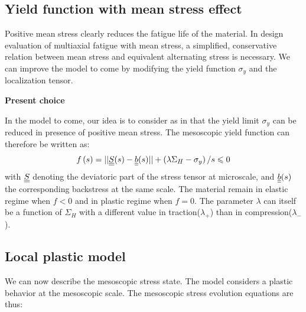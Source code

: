 \newpage
\subsection{Yield function with mean stress effect}
\label{sec:5.4.3}
Positive mean stress clearly reduces the fatigue life of the material. In design evaluation of multiaxial fatigue with mean stress, a simplified, conservative relation between mean stress and equivalent alternating stress is necessary. We can improve the model to come by modifying the yield function $\sigma_y$ and the localization tensor.

\vspace{6pt}
\textbf{Present choice}
\vspace{6pt}

In the model to come, our idea is to consider as in \cite{Maitournam2011232} that the yield limit $\sigma_y$ can be reduced in presence of positive mean stress. The mesoscopic yield function can therefore be written as:
\begin{equation}
f\left(s\right)=||\uline{\uline{S}}(s)-\uline{\uline{b}}(s)||+\left( \lambda \Sigma_H-\sigma_y\right) /s\leqslant 0
\label{eq.yieldfun}
\end{equation}
with $\uline{\uline{S}}$ denoting the deviatoric part of the stress tensor at microscale, and $\uline{\uline{b}}(s)$ the corresponding backstress at the same scale. The material remain in elastic regime when $f<0$ and in plastic regime when $f=0$. The parameter $\lambda$ can itself be a function of $\Sigma_H$ with a different value in traction($\lambda_+$) than in compression($\lambda_-$).


\subsection{Local plastic model}
We can now describe the mesoscopic stress state.  The model considers a plastic 
behavior at the mesoscopic scale. The mesoscopic stress evolution equations are thus:

